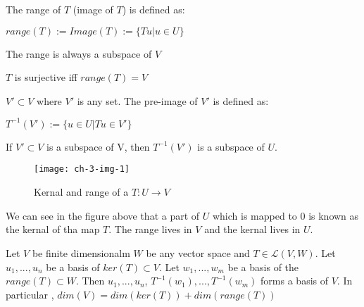 \begin{definition}
	The range of $T$ (image of $T$) is defined as: 
	\begin{center}
		$range(T) := Image(T) := \{Tu | u \in U\}$
	\end{center}
\end{definition}

\begin{proposition}
	The range is always a subspace of $V$
\end{proposition}

$T$ is surjective iff $range(T) = V$

\begin{definition}
	$V' \subset V$ where $V'$ is any set. The pre-image of $V'$ is defined as: 
	\begin{center}
		$T^{-1} (V') := \{u \in U | Tu \in V'\}$
	\end{center} 
\end{definition}

\begin{proposition}
	If $V' \subset V$ is a subspace of V, then $T^{-1}(V')$ is a subspace of $U$.
\end{proposition}

\begin{figure}[h]
	\centering
	\texttt{[image: ch-3-img-1]}
	\caption{Kernal and range of a $T: U \rightarrow V$}
\end{figure}

We can see in the figure above that a part of $U$ which is mapped to 0 is known as the kernal of tha map $T$. The range lives in $V$ and the kernal lives in $U$. 

\begin{theorem}
	Let $V$ be finite dimensionalm $W$ be any vector space and $T \in \mathcal{L}(V,W)$. Let $u_1,...,u_n$ be a basis of $ker(T) \subset V$. Let $w_1,...,w_m$ be a basis of the $range(T) \subset W$. Then $u_1,...,u_n$, $T^{-1}(w_1),...,T^{-1}(w_m)$ forms a basis of $V$. In particular , $dim(V) = dim(ker(T)) + dim(range(T))$
\end{theorem}

